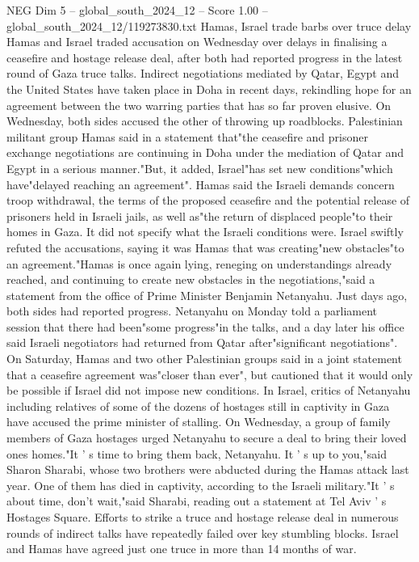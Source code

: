 \begin{textsample}{NEG Dim 5 – global\_south\_2024\_12 – Score 1.00 – global\_south\_2024\_12/119273830.txt}  \label{ex:f5_neg_406}
Hamas, Israel trade barbs over truce delay Hamas and Israel traded accusation on Wednesday over delays in finalising a ceasefire and hostage release deal, after both had reported progress in the latest round of Gaza truce talks.
Indirect negotiations mediated by Qatar, Egypt and the United States have taken place in Doha in recent days, rekindling hope for an agreement between the two warring parties that has so far proven elusive.
On Wednesday, both sides accused the other of throwing up roadblocks.
Palestinian militant group Hamas said in a statement that"the ceasefire and prisoner exchange negotiations are continuing in Doha under the mediation of Qatar and Egypt in a serious manner."But, it added, Israel"has set new conditions"which have"delayed reaching an agreement".
Hamas said the Israeli demands concern troop withdrawal, the terms of the proposed ceasefire and the potential release of prisoners held in Israeli jails, as well as"the return of displaced people"to their homes in Gaza.
It did not specify what the Israeli conditions were.
Israel swiftly refuted the accusations, saying it was Hamas that was creating"new obstacles"to an agreement."Hamas is once again lying, reneging on understandings already reached, and continuing to create new obstacles in the negotiations,"said a statement from the office of Prime Minister Benjamin Netanyahu.
Just days ago, both sides had reported progress.
Netanyahu on Monday told a parliament session that there had been"some progress"in the talks, and a day later his office said Israeli negotiators had returned from Qatar after"significant negotiations".
On Saturday, Hamas and two other Palestinian groups said in a joint statement that a ceasefire agreement was"closer than ever", but cautioned that it would only be possible if Israel did not impose new conditions.
In Israel, critics of Netanyahu including relatives of some of the dozens of hostages still in captivity in Gaza have accused the prime minister of stalling.
On Wednesday, a group of family members of Gaza hostages urged Netanyahu to secure a deal to bring their loved ones homes."It ' s time to bring them back, Netanyahu.
It ' s up to you,"said Sharon Sharabi, whose two brothers were abducted during the Hamas attack last year.
One of them has died in captivity, according to the Israeli military."It ' s about time, don't wait,"said Sharabi, reading out a statement at Tel Aviv ' s Hostages Square.
Efforts to strike a truce and hostage release deal in numerous rounds of indirect talks have repeatedly failed over key stumbling blocks.
Israel and Hamas have agreed just one truce in more than 14 months of war.

\end{textsample}
